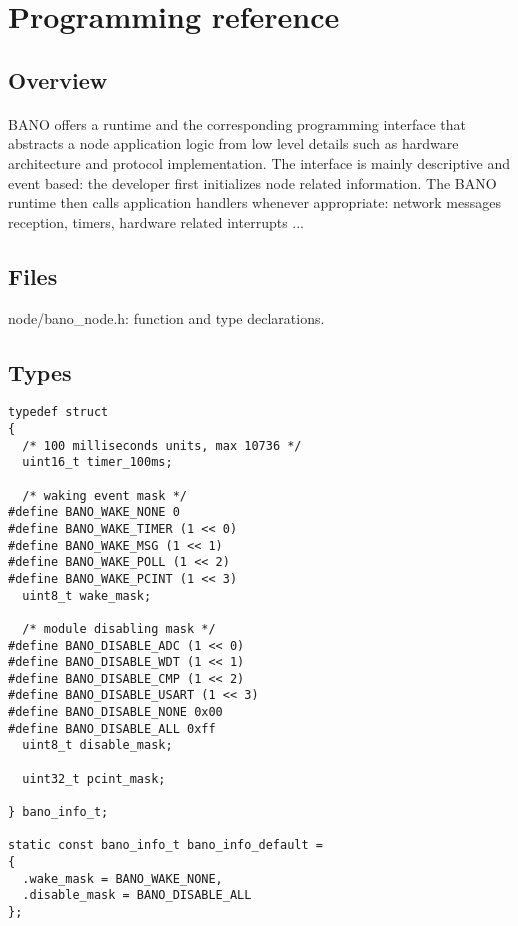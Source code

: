 \documentclass[a4paper, 11pt]{article}
\begin{document}
\clearpage
\section{Programming reference}

\subsection{Overview}
\paragraph{}
BANO offers a runtime and the corresponding programming interface
that abstracts a node application logic from low level details
such as hardware architecture and protocol implementation. The
interface is mainly descriptive and event based: the developer
first initializes node related information. The BANO runtime then
calls application handlers whenever appropriate: network messages
reception, timers, hardware related interrupts ...

\subsection{Files}
node/bano\_node.h: function and type declarations.

\subsection{Types}
\begin{scriptsize}
\begin{verbatim}
typedef struct
{
  /* 100 milliseconds units, max 10736 */
  uint16_t timer_100ms;

  /* waking event mask */
#define BANO_WAKE_NONE 0
#define BANO_WAKE_TIMER (1 << 0)
#define BANO_WAKE_MSG (1 << 1)
#define BANO_WAKE_POLL (1 << 2)
#define BANO_WAKE_PCINT (1 << 3)
  uint8_t wake_mask;

  /* module disabling mask */
#define BANO_DISABLE_ADC (1 << 0)
#define BANO_DISABLE_WDT (1 << 1)
#define BANO_DISABLE_CMP (1 << 2)
#define BANO_DISABLE_USART (1 << 3)
#define BANO_DISABLE_NONE 0x00
#define BANO_DISABLE_ALL 0xff
  uint8_t disable_mask;

  uint32_t pcint_mask;

} bano_info_t;

static const bano_info_t bano_info_default =
{
  .wake_mask = BANO_WAKE_NONE,
  .disable_mask = BANO_DISABLE_ALL
};
\end{verbatim}
\end{scriptsize}
\end{document}
